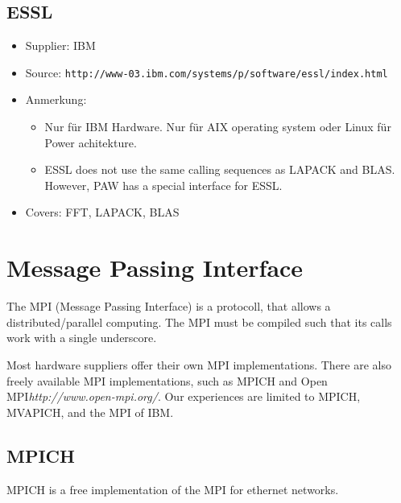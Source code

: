 \documentclass[a4paper,10pt]{report}
\newcommand{\mytt}[1]{{\tt #1}}
\begin{document}
\subsection{ESSL}
\begin{itemize}
\item Supplier: IBM
\item Source: \mytt{http://www-03.ibm.com/systems/p/software/essl/index.html}
\item Anmerkung: 
\begin{itemize}
\item Nur f\"ur IBM Hardware. Nur f\"ur AIX operating
system oder Linux f\"ur Power achitekture.
\item ESSL does not use the same calling sequences as LAPACK and
BLAS. However, PAW has a special interface for ESSL.
\end{itemize}
\item Covers: FFT, LAPACK, BLAS
\end{itemize}

\newpage
\section{Message Passing Interface}
The MPI (Message Passing Interface) is a protocoll, that allows a
distributed/parallel computing. The MPI must be compiled such that its
calls work with a single underscore.

Most hardware suppliers offer their own MPI implementations. 
There are also freely available MPI implementations, such as  MPICH and Open
MPI\textit{http://www.open-mpi.org/}. Our experiences are limited to
 MPICH,  MVAPICH, and the MPI of IBM.

\subsection{MPICH}
\label{sec:mpich}
MPICH is a free implementation of the MPI for  ethernet networks.
\end{document}

